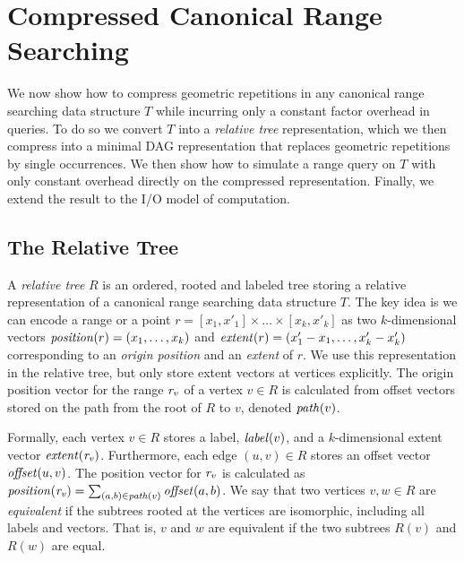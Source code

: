\section{Compressed Canonical Range Searching}\label{sec:compcrs}
We now show how to compress geometric repetitions in any canonical range searching data structure $T$ while incurring only a constant factor overhead in queries. To do so we convert $T$ into a \emph{relative tree} representation, which we then compress into a minimal DAG representation that replaces geometric repetitions by single occurrences. We then show how to simulate a range query on $T$ with only constant overhead directly on the compressed representation. Finally, we extend the result to the I/O model of computation.

\subsection{The Relative Tree}
A \emph{relative tree} $R$ is an ordered, rooted and labeled tree storing a relative representation of a canonical range searching data structure $T$. The key idea is we can encode a range or a point $r = [ x_1, x'_1 ] \times \ldots \times [ x_k, x'_k ]$ as two $k$-dimensional vectors $\mathit{position}(r) = (x_1, \ldots, x_k)$ and $\mathit{extent}(r) = (x'_1 - x_1, \ldots, x'_k - x'_k)$ corresponding to an \emph{origin position} and an \emph{extent} of $r$. We use this representation in the relative tree, but only store extent vectors at vertices explicitly. The origin position vector for the range $\mathit{r_{v}}$ of a vertex $v \in R$ is calculated from offset vectors stored on the path from the root of $R$ to $v$, denoted $\mathit{path}(v)$. 

Formally, each vertex $v \in R$ stores a label, $\mathit{label}(v)$, and a $k$-dimensional extent vector $\mathit{extent}(\mathit{r_{v}})$. Furthermore, each edge $(u, v) \in R$ stores an offset vector $\mathit{offset}(u, v)$. The position vector for $\mathit{r_{v}}$ is calculated as $\mathit{position}(\mathit{r_{v}}) = \sum_{(a, b) \in \mathit{path}(v)} \mathit{offset}(a, b)$.
We say that two vertices $v, w \in R$ are \emph{equivalent} if the subtrees rooted at the vertices are isomorphic, including all labels and vectors. That is, $v$ and $w$ are equivalent if the two subtrees $R(v)$ and $R(w)$ are equal. 

